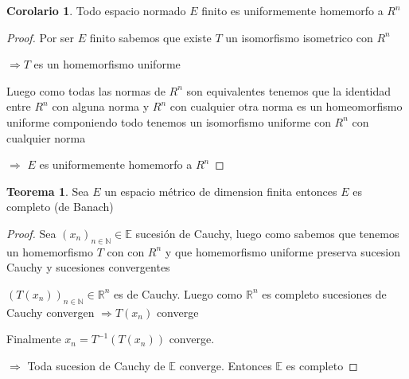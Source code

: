 \documentclass[12pt]{article}
\newcommand{\R}{\mathbb{R}}
\newcommand{\E}{\mathbb{E}}
\newcommand{\N}{\mathbb{N}}
\newcommand{\Ra}{\Rightarrow}
\theoremstyle{definition}
\newtheorem{theorem}{Teorema}
\newtheorem{corollary}{Corolario}[theorem]
\begin{document}
\begin{corollary}
  Todo espacio normado $E$ finito es uniformemente homemorfo a $R^{n}$

  \begin{proof}
    Por ser $E$ finito sabemos que existe $T$ un isomorfismo isometrico con $R^{n} $ 

    $\Ra T $ es un homemorfismo uniforme 

    Luego como todas las normas de $R^n$ son equivalentes tenemos que la identidad entre $R^n$ con alguna norma y $R^n$ con cualquier otra norma es un homeomorfismo uniforme componiendo todo tenemos un isomorfismo uniforme con $R^n$ con cualquier norma

  $\Ra$ $E$ es uniformemente homemorfo a $R^n$
  \end{proof}
\end{corollary}


\begin{theorem}
Sea $E$ un espacio métrico de dimension finita entonces $E$ es completo (de Banach)

\begin{proof}
  Sea $(x_{n})_{n \in \N} \in \E$ sucesión de Cauchy, luego como sabemos que tenemos un homemorfismo $T$ con con $R^n$ y que homemorfismo uniforme preserva sucesion Cauchy y sucesiones convergentes

$(T(x_{n}))_{n \in \N} \in \R^n$ es de Cauchy. Luego como $\R^n$ es completo sucesiones de Cauchy convergen $\Ra T(x_{n})$ converge

Finalmente $x_{n} = T^{-1}(T(x_{n}))$ converge.

$\Ra$ Toda sucesion de Cauchy de $\E$ converge. Entonces $\E$ es completo 
\end{proof}
\end{theorem}
\end{document}
